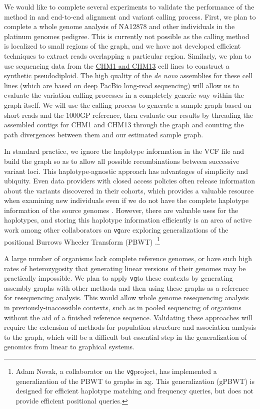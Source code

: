 \documentclass[12pt]{article}
\newcommand{\vg}{{\tt vg}}
\begin{document}
We would like to complete several experiments to validate the performance of the method in and end-to-end alignment and variant calling process.
First, we plan to complete a whole genome analysis of NA12878 and other individuals in the platinum genomes pedigree.
This is currently not possible as the calling method is localized to small regions of the graph, and we have not developed efficient techniques to extract reads overlapping a particular region.
Similarly, we plan to use sequencing data from the \href{http://www.ncbi.nlm.nih.gov/assembly/706168/}{CHM1 and CHM13} cell lines to construct a synthetic pseudodiploid.
The high quality of the \emph{de novo} assemblies for these cell lines (which are based on deep PacBio long-read sequencing) will allow us to evaluate the variation calling processes in a completely generic way within the graph itself.
We will use the calling process to generate a sample graph based on short reads and the 1000GP reference, then evaluate our results by threading the assembled contigs for CHM1 and CHM13 through the graph and counting the path divergences between them and our estimated sample graph.

In standard practice, we ignore the haplotype information in the VCF file and build the graph so as to allow all possible recombinations between successive variant loci.
This haplotype-agnostic approach has advantages of simplicity and ubiquity.
Even data providers with closed access policies often release information about the variants discovered in their cohorts, which provides a valuable resource when examining new individuals even if we do not have the complete haplotype information of the source genomes \cite{exac2015}.
However, there are valuable uses for the haplotypes, and storing this haplotype information efficiently is an area of active work among other collaborators on \vg are exploring generalizations of the positional Burrows Wheeler Transform (PBWT) \cite{durbin2014}.\footnote{Adam Novak, a collaborator on the \vg project, has implemented a generalization of the PBWT to graphs in xg. This generalization (gPBWT) is designed for efficient haplotype matching and frequency queries, but does not provide efficient positional queries.}

A large number of organisms lack complete reference genomes, or have such high rates of heterozygosity that generating linear versions of their genomes may be practically impossible.
We plan to apply \vg to these contexts by generating assembly graphs with other methods and then using these graphs as a reference for resequencing analysis.
This would allow whole genome resequencing analysis in previously-inaccessible contexts, such as in pooled sequencing of organisms without the aid of a finished reference sequence. 
Validating these approaches will require the extension of methods for population structure and association analysis to the graph, which will be a difficult but essential step in the generalization of genomics from linear to graphical systems.
\end{document}

